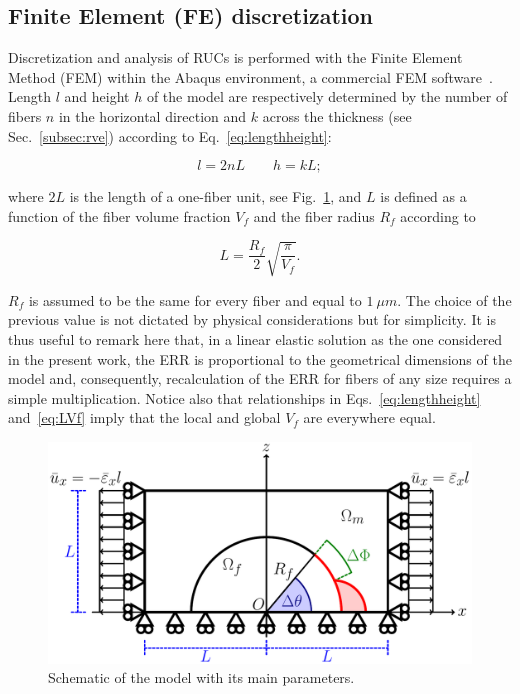 \documentclass[smallextended]{svjour3}       %
\begin{document}
\subsection{Finite Element (FE) discretization}

Discretization and analysis of RUCs is performed with the Finite Element Method (FEM) within the Abaqus environment, a commercial FEM software~\cite{abq12}. Length $l$ and height $h$ of the model are respectively determined by the number of fibers $n$ in the horizontal direction and $k$ across the thickness (see Sec.~\ref{subsec:rve}) according to Eq.~\ref{eq:lengthheight}:

\begin{equation}\label{eq:lengthheight}
l=2nL\qquad h=kL;
\end{equation}

where $2L$ is the length of a one-fiber unit, see Fig.~\ref{fig:modelschem}, and $L$ is defined as a function of the fiber volume fraction $V_{f}$ and the fiber radius $R_{f}$ according to

\begin{equation}\label{eq:LVf}
L=\frac{R_{f}}{2}\sqrt{\frac{\pi}{V_{f}}}.
\end{equation}

$R_{f}$ is assumed to be the same for every fiber and equal to $1\ \mu m$. The choice of the previous value is not dictated by physical considerations but for simplicity. It is thus useful to remark here that, in a linear elastic solution as the one considered in the present work, the ERR is proportional to the geometrical dimensions of the model and, consequently, recalculation of the ERR for fibers of any size requires a simple multiplication. Notice also that relationships in Eqs.~\ref{eq:lengthheight} and~\ref{eq:LVf} imply that the local and global $V_{f}$ are everywhere equal.

\begin{figure}[!h]
\centering
\includegraphics[width=\textwidth]{RUC.pdf}
\caption{Schematic of the model with its main parameters.}\label{fig:modelschem}
\end{figure}
\end{document}
